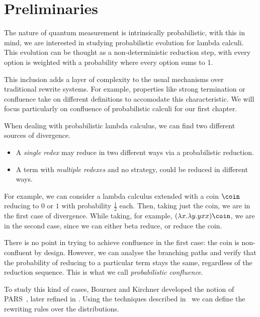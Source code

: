 \section{Preliminaries}
The nature of quantum measurement is intrinsically probabilistic, with this in mind, we are interested in studying probabilistic evolution for lambda calculi. This evolution can be thought as a non-deterministic reduction step, with every option is weighted with a probability where every option sums to 1.

This inclusion adds a layer of complexity to the usual mechanisms over traditional rewrite systems. For example, properties like strong termination or confluence take on different definitions to accomodate this characteristic. We will focus particularly on confluence of probabilistic calculi for our first chapter.


When dealing with probabilistic lambda calculus, we can find two different sources of divergence.
\begin{itemize}
\item A \textit{single redex} may reduce in two different ways via a probabilistic reduction.
\item A term with \textit{multiple redexes} and no strategy, could be reduced in different ways.
\end{itemize}
For example, we can consider a lambda calculus extended with a coin $\coin$ reducing to $0$ or $1$ with probability $\frac 12$ each. Then, taking just the coin, we are in the first case of divergence. While taking, for example, $(\lambda x.\lambda y.yxx)\coin$, we are in the second case, since we can either beta reduce, or reduce the coin.

There is no point in trying to achieve confluence in the first case: the coin is non-confluent by design. However, we can analyse the branching paths and verify that the probability of reducing to a particular term stays the same, regardless of the reduction sequence. This is what we call \textit{probabilistic confluence}.

To study this kind of cases, Bournez and Kirchner developed the notion of PARS~\cite{BK02}, later refined in \cite{BG06}. Using the techniques described in~\cite{DCM17,Faggian} we can define the rewriting rules over the distributions. 

